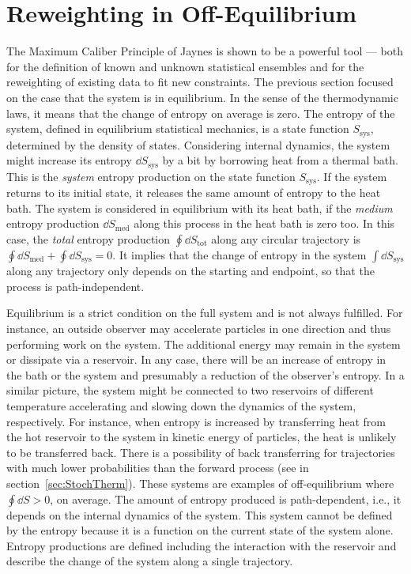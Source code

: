 \section{Reweighting in Off-Equilibrium}
\label{sec:RewOffEqu}
The Maximum Caliber Principle of Jaynes is shown to be a powerful tool --- both for the definition of known and unknown statistical ensembles and for the reweighting of existing data to fit new constraints. The previous section focused on the case that the system is in equilibrium. In the sense of the thermodynamic laws, it means that the change of entropy on average is zero. The entropy of the system, defined in equilibrium statistical mechanics, is a state function $S_{\text{sys}}$, determined by the density of states. Considering internal dynamics, the system might increase its entropy $\dd{S_{\text{sys}}}$ by a bit by borrowing heat from a thermal bath.  This is the \textit{system} entropy production on the state function $S_{\text{sys}}$. If the system returns to its initial state, it releases the same amount of entropy to the heat bath. The system is considered in equilibrium with its heat bath, if the \textit{medium} entropy production $\dd{S_{\text{med}}}$ along this process in the heat bath is zero too. In this case, the \textit{total} entropy production $\oint \dd{S_{\text{tot}}}$ along any circular trajectory is $\oint \dd{S_{\text{med}}}+ \oint\dd{S_{\text{sys}}} =0$. It implies that the change of entropy in the system $\int \dd{S_{\text{sys}}}$ along any trajectory only depends on the starting and endpoint, so that the process is path-independent. 

Equilibrium is a strict condition on the full system and is not always fulfilled. For instance, an outside observer may accelerate particles in one direction and thus performing work on the system. The additional 
energy may remain in the system or dissipate via a reservoir. In any case, there will be an increase of entropy in the bath or the system and presumably a reduction of the observer's entropy. In a similar picture, the system might be connected to two reservoirs of different temperature accelerating and slowing down the dynamics of the system, respectively. For instance, when entropy is increased by transferring heat from the hot reservoir to the system in kinetic energy of particles, the heat is unlikely to be transferred back. There is a possibility of back transferring for trajectories with much lower probabilities than the forward process (see in section~\ref{sec:StochTherm}).  These systems are examples of off-equilibrium where $\oint \dd{S} > 0$, on average.  The amount of entropy produced is path-dependent, i.e., it depends on the internal dynamics of the system. This system cannot be defined by the entropy because it is a function on the current state of the system alone. Entropy productions are defined including the interaction with the reservoir and describe the change of the system along a single trajectory. 

